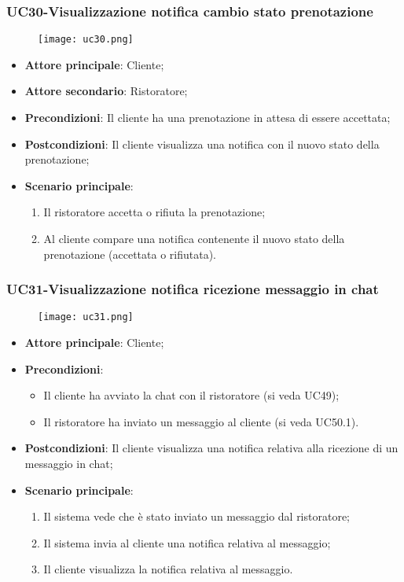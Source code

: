 \pagebreak
\subsubsection{UC30-Visualizzazione notifica cambio stato prenotazione}
\begin{figure}[h] \texttt{[image: uc30.png]} \end{figure}

\begin{itemize}
\item \textbf{Attore principale}: Cliente;
\item \textbf{Attore secondario}: Ristoratore;
\item \textbf{Precondizioni}: Il cliente ha una prenotazione in attesa di essere accettata;
\item \textbf{Postcondizioni}: Il cliente visualizza una notifica con il nuovo stato della prenotazione;
\item \textbf{Scenario principale}:
\begin{enumerate}
\item Il ristoratore accetta o rifiuta la prenotazione;
\item Al cliente compare una notifica contenente il nuovo stato della prenotazione (accettata o rifiutata).
\end{enumerate}
\end{itemize}

\subsubsection{UC31-Visualizzazione notifica ricezione messaggio in chat}
\begin{figure}[h] \texttt{[image: uc31.png]} \end{figure}

\begin{itemize}
\item \textbf{Attore principale}: Cliente;
\item \textbf{Precondizioni}:
\begin{itemize}
\item Il cliente ha avviato la chat con il ristoratore (si veda UC49);
\item Il ristoratore ha inviato un messaggio al cliente (si veda UC50.1).
\end{itemize}
\item \textbf{Postcondizioni}: Il cliente visualizza una notifica relativa alla ricezione di un messaggio in chat;
\item \textbf{Scenario principale}:
\begin{enumerate}
\item Il sistema vede che è stato inviato un messaggio dal ristoratore;
\item Il sistema invia al cliente una notifica relativa al messaggio;
\item Il cliente visualizza la notifica relativa al messaggio.
\end{enumerate}
\end{itemize}

